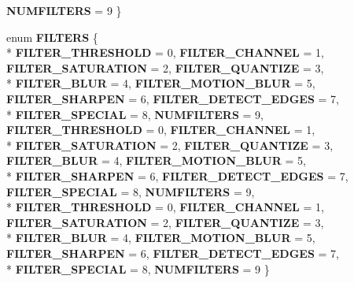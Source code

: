 \begin{DoxyCompactItemize}
{\bfseries N\-U\-M\-F\-I\-L\-T\-E\-R\-S} = 9
 \}
\item 
enum {\bfseries F\-I\-L\-T\-E\-R\-S} \{ \\*
{\bfseries F\-I\-L\-T\-E\-R\-\_\-\-T\-H\-R\-E\-S\-H\-O\-L\-D} = 0, 
{\bfseries F\-I\-L\-T\-E\-R\-\_\-\-C\-H\-A\-N\-N\-E\-L} = 1, 
{\bfseries F\-I\-L\-T\-E\-R\-\_\-\-S\-A\-T\-U\-R\-A\-T\-I\-O\-N} = 2, 
{\bfseries F\-I\-L\-T\-E\-R\-\_\-\-Q\-U\-A\-N\-T\-I\-Z\-E} = 3, 
\\*
{\bfseries F\-I\-L\-T\-E\-R\-\_\-\-B\-L\-U\-R} = 4, 
{\bfseries F\-I\-L\-T\-E\-R\-\_\-\-M\-O\-T\-I\-O\-N\-\_\-\-B\-L\-U\-R} = 5, 
{\bfseries F\-I\-L\-T\-E\-R\-\_\-\-S\-H\-A\-R\-P\-E\-N} = 6, 
{\bfseries F\-I\-L\-T\-E\-R\-\_\-\-D\-E\-T\-E\-C\-T\-\_\-\-E\-D\-G\-E\-S} = 7, 
\\*
{\bfseries F\-I\-L\-T\-E\-R\-\_\-\-S\-P\-E\-C\-I\-A\-L} = 8, 
{\bfseries N\-U\-M\-F\-I\-L\-T\-E\-R\-S} = 9, 
{\bfseries F\-I\-L\-T\-E\-R\-\_\-\-T\-H\-R\-E\-S\-H\-O\-L\-D} = 0, 
{\bfseries F\-I\-L\-T\-E\-R\-\_\-\-C\-H\-A\-N\-N\-E\-L} = 1, 
\\*
{\bfseries F\-I\-L\-T\-E\-R\-\_\-\-S\-A\-T\-U\-R\-A\-T\-I\-O\-N} = 2, 
{\bfseries F\-I\-L\-T\-E\-R\-\_\-\-Q\-U\-A\-N\-T\-I\-Z\-E} = 3, 
{\bfseries F\-I\-L\-T\-E\-R\-\_\-\-B\-L\-U\-R} = 4, 
{\bfseries F\-I\-L\-T\-E\-R\-\_\-\-M\-O\-T\-I\-O\-N\-\_\-\-B\-L\-U\-R} = 5, 
\\*
{\bfseries F\-I\-L\-T\-E\-R\-\_\-\-S\-H\-A\-R\-P\-E\-N} = 6, 
{\bfseries F\-I\-L\-T\-E\-R\-\_\-\-D\-E\-T\-E\-C\-T\-\_\-\-E\-D\-G\-E\-S} = 7, 
{\bfseries F\-I\-L\-T\-E\-R\-\_\-\-S\-P\-E\-C\-I\-A\-L} = 8, 
{\bfseries N\-U\-M\-F\-I\-L\-T\-E\-R\-S} = 9, 
\\*
{\bfseries F\-I\-L\-T\-E\-R\-\_\-\-T\-H\-R\-E\-S\-H\-O\-L\-D} = 0, 
{\bfseries F\-I\-L\-T\-E\-R\-\_\-\-C\-H\-A\-N\-N\-E\-L} = 1, 
{\bfseries F\-I\-L\-T\-E\-R\-\_\-\-S\-A\-T\-U\-R\-A\-T\-I\-O\-N} = 2, 
{\bfseries F\-I\-L\-T\-E\-R\-\_\-\-Q\-U\-A\-N\-T\-I\-Z\-E} = 3, 
\\*
{\bfseries F\-I\-L\-T\-E\-R\-\_\-\-B\-L\-U\-R} = 4, 
{\bfseries F\-I\-L\-T\-E\-R\-\_\-\-M\-O\-T\-I\-O\-N\-\_\-\-B\-L\-U\-R} = 5, 
{\bfseries F\-I\-L\-T\-E\-R\-\_\-\-S\-H\-A\-R\-P\-E\-N} = 6, 
{\bfseries F\-I\-L\-T\-E\-R\-\_\-\-D\-E\-T\-E\-C\-T\-\_\-\-E\-D\-G\-E\-S} = 7, 
\\*
{\bfseries F\-I\-L\-T\-E\-R\-\_\-\-S\-P\-E\-C\-I\-A\-L} = 8, 
{\bfseries N\-U\-M\-F\-I\-L\-T\-E\-R\-S} = 9
 \}
\end{DoxyCompactItemize}
